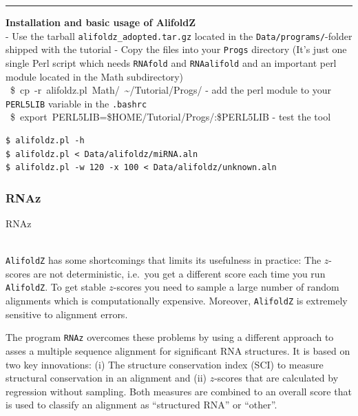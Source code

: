 \documentclass[]{article}
\begin{document}
\begin{center}\rule{0.5\linewidth}{\linethickness}\end{center}

\textbf{Installation and basic usage of AlifoldZ}\\
- Use the tarball \texttt{alifoldz\_adopted.tar.gz} located in the
\texttt{Data/programs/}-folder shipped with the tutorial - Copy the files
into your \texttt{Progs} directory (It's just one single Perl script
which needs \texttt{RNAfold} and \texttt{RNAalifold} and an important
perl module located in the Math subdirectory)\\
 {{~\$~cp~-r~alifoldz.pl~Math/~\textasciitilde{}/Tutorial/Progs/}} - add
the perl module to your \texttt{PERL5LIB} variable in the
\texttt{.bashrc}\\
 {{~\$~export~PERL5LIB=\$HOME/Tutorial/Progs/:\$PERL5LIB}} - test the
tool

\begin{verbatim}
$ alifoldz.pl -h
$ alifoldz.pl < Data/alifoldz/miRNA.aln
$ alifoldz.pl -w 120 -x 100 < Data/alifoldz/unknown.aln
\end{verbatim}

\subsubsection{RNAz}{RNAz}\label{rnaz}

\\
\texttt{AlifoldZ} has some shortcomings that limits its usefulness in
practice: The \(z\)-scores are not deterministic, i.e.~you get a
different score each time you run \texttt{AlifoldZ}. To get stable
\(z\)-scores you need to sample a large number of random alignments
which is computationally expensive. Moreover, \texttt{AlifoldZ} is
extremely sensitive to alignment errors.

The program \texttt{RNAz} overcomes these problems by using a different
approach to asses a multiple sequence alignment for significant RNA
structures. It is based on two key innovations: (i) The structure
conservation index (SCI) to measure structural conservation in an
alignment and (ii) \(z\)-scores that are calculated by regression
without sampling. Both measures are combined to an overall score that is
used to classify an alignment as ``structured RNA'' or ``other''.
\end{document}
